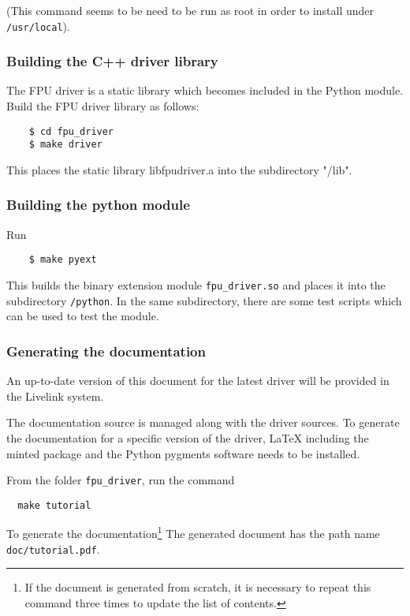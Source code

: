 \documentclass{scrartcl}[12pt,a4paper]
\begin{document}
(This command seems to be need to be run as root in order to install
  under \texttt{/usr/local}).



\subsubsection{Building the C++ driver library}

The FPU driver is a static library which becomes included in the
Python module.  Build the FPU driver library as follows:

  \begin{verbatim}
    $ cd fpu_driver
    $ make driver
  \end{verbatim}    

This places the static library libfpudriver.a into
the subdirectory "/lib".

\subsubsection{Building the python module}

Run

  \begin{verbatim}
    $ make pyext
  \end{verbatim}    

This builds the binary extension module \verb+fpu_driver.so+
and places it into the subdirectory \verb+/python+.
In the same subdirectory, there are some test
scripts which can be used to test the module.

\subsubsection{Generating the documentation}

An up-to-date version of this document for the
latest driver will be provided in the Livelink
system.

The documentation source is managed along with the driver sources.  To
generate the documentation for a specific version of the driver,
\LaTeX{} including the minted package and the
Python pygments software needs to be installed.

From the folder \texttt{fpu\_driver}, run the
command

\begin{verbatim}
  make tutorial
\end{verbatim}

To generate the documentation\footnote{If the document is generated
  from scratch, it is necessary to repeat this command three times to
  update the list of contents.} The generated document has the path
name \texttt{doc/tutorial.pdf}.
\end{document}
